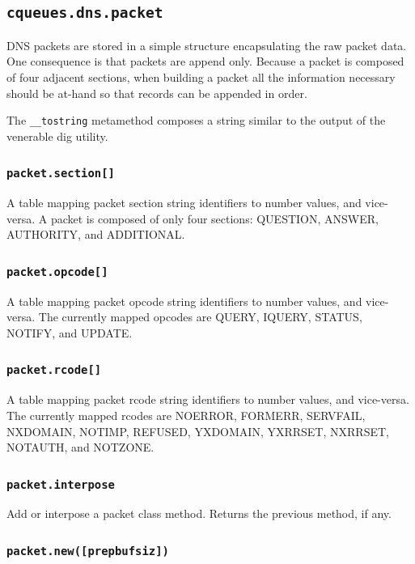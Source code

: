 \documentclass[11pt, oneside]{memoir}
\newcommand*{\fn}[1]{\texttt{#1}\xspace}
\newcounter{toccols}
\newenvironment{Module}[1]{
	\subsection{\texttt{#1}}
	\addtocontents{toc}{
		\protect\begin{multicols}{\value{toccols}}
	}
}{
	\addtocontents{toc}{\protect\end{multicols}}
}
\begin{document}
\begin{Module}{cqueues.dns.packet}

DNS packets are stored in a simple structure encapsulating the raw packet data. One consequence is that packets are append only. Because a packet is composed of four adjacent sections, when building a packet all the information necessary should be at-hand so that records can be appended in order.

The \fn{\_\_tostring} metamethod composes a string similar to the output of the venerable dig utility.

\subsubsection[\fn{packet.section[]}]{\fn{packet.section[]}}

A table mapping packet section string identifiers to number values, and vice-versa. A packet is composed of only four sections: QUESTION, ANSWER, AUTHORITY, and ADDITIONAL.

\subsubsection[\fn{packet.opcode[]}]{\fn{packet.opcode[]}}

A table mapping packet opcode string identifiers to number values, and vice-versa. The currently mapped opcodes are QUERY, IQUERY, STATUS, NOTIFY, and UPDATE.

\subsubsection[\fn{packet.rcode[]}]{\fn{packet.rcode[]}}

A table mapping packet rcode string identifiers to number values, and vice-versa. The currently mapped rcodes are NOERROR, FORMERR, SERVFAIL, NXDOMAIN, NOTIMP, REFUSED, YXDOMAIN, YXRRSET, NXRRSET, NOTAUTH, and NOTZONE.

\subsubsection[\fn{packet.interpose}]{\fn{packet.interpose}}

Add or interpose a packet class method. Returns the previous method, if any.

\subsubsection[\fn{packet.new}]{\fn{packet.new([prepbufsiz])}}


\end{Module}
\end{document}
